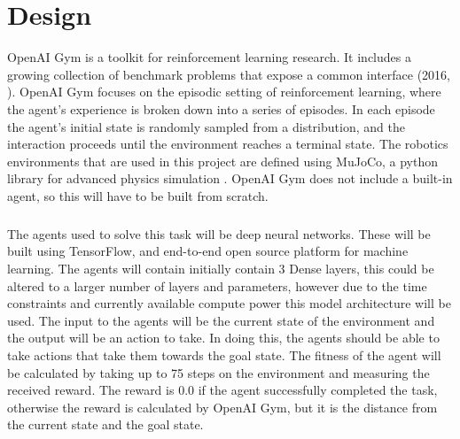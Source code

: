 \chapter{Design}

OpenAI Gym is a toolkit for reinforcement learning research. It includes a growing collection of benchmark problems that expose a common interface (2016, \cite{gym}). OpenAI Gym focuses on the episodic setting of reinforcement learning, where the agent's experience is broken down into a series of episodes. In each episode the agent's initial state is randomly sampled from a distribution, and the interaction proceeds until the environment reaches a terminal state. The robotics environments that are used in this project are defined using MuJoCo, a python library for advanced physics simulation \cite{mujoco}. OpenAI Gym does not include a built-in agent, so this will have to be built from scratch.

\paragraph{}

The agents used to solve this task will be deep neural networks. These will be built using TensorFlow, and end-to-end open source platform for machine learning. The agents will contain initially contain 3 Dense layers, this could be altered to a larger number of layers and parameters, however due to the time constraints and currently available compute power this model architecture will be used. The input to the agents will be the current state of the environment and the output will be an action to take. In doing this, the agents should be able to take actions that take them towards the goal state. The fitness of the agent will be calculated by taking up to 75 steps on the environment and measuring the received reward. The reward is 0.0 if the agent successfully completed the task, otherwise the reward is calculated by OpenAI Gym, but it is the distance from the current state and the goal state.

\paragraph{}

